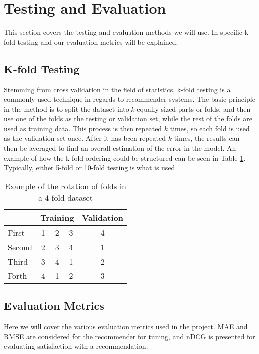 \section{Testing and Evaluation}
This section covers the testing and evaluation methods we will use. In specific k-fold testing and our evaluation metrics will be explained.

\subsection{K-fold Testing}
Stemming from cross validation in the field of statistics, k-fold testing is a commonly used technique in regards to recommender systems\cite{kfold}. The basic principle in the method is to split the dataset into $k$ equally sized parts or folds, and then use one of the folds as the testing or validation set, while the rest of the folds are used as training data. This process is then repeated $k$ times, so each fold is used as the validation set once. After it has been repeated $k$ times, the results can then be averaged to find an overall estimation of the error in the model. An example of how the k-fold ordering could be structured can be seen in Table \ref{tbl:bg_k-fold}. Typically, either 5-fold or 10-fold testing is what is used.

\begin{table}[H]
	\centering
	\begin{tabular}{|l|c|c|c|c|}
		\hline
		& \multicolumn{3}{l|}{Training} & \multicolumn{1}{l|}{Validation} \\ \hline
		First  & 1        & 2        & 3       & 4                               \\ \hline
		Second & 2        & 3        & 4       & 1                               \\ \hline
		Third  & 3        & 4        & 1       & 2                               \\ \hline
		Forth  & 4        & 1        & 2       & 3                               \\ \hline
	\end{tabular}
	\caption{Example of the rotation of folds in a 4-fold dataset}
	\label{tbl:bg_k-fold}
\end{table}

\subsection{Evaluation Metrics}
Here we will cover the various evaluation metrics used in the project. MAE and RMSE are considered for the recommender for tuning, and nDCG is presented for evaluating satisfaction with a recommendation.

